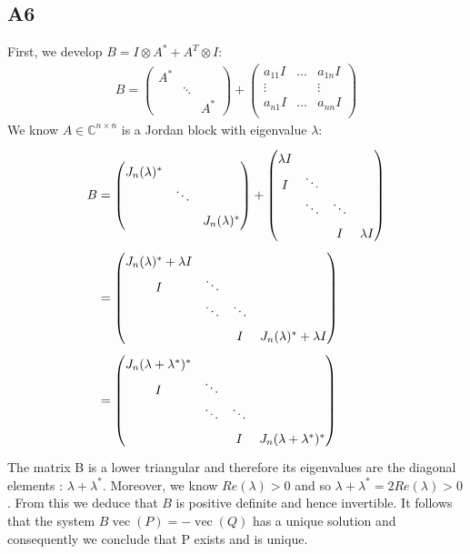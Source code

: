\documentclass[11pt]{article}
\newcommand{\kp}{\otimes}
\DeclareMathOperator{\vect}{vec}
\DeclareMathOperator{\vect}{vec}
\newcommand{\complex}{\mathbb{C}} %
\begin{document}
\subsection*{A6}
First, we develop $B=I\kp A^*+A^T\kp I$:
\begin{align*}
    B=
    \begin{pmatrix}
    A^* & & \\
    &\ddots&\\
    & & A^*
    \end{pmatrix}+
    \begin{pmatrix}
    a_{11} I & \dots & a_{1n} I\\
    \vdots & & \vdots\\
    a_{n1} I & \dots & a_{nn} I\\
    \end{pmatrix}
\end{align*}
We know $A\in\complex^{n\times n}$ is a Jordan block with eigenvalue $\lambda$:
\begin{align*}
    B&=
    \renewcommand{\arraystretch}{1.5}
    \begin{pmatrix}
    J_n(\lambda)^* & & \\
    &\ddots&\\
    & & J_n(\lambda)^*
    \end{pmatrix}+
    \begin{pmatrix}
    \lambda I & & &\\
    I & \ddots & &\\
    & \ddots & \ddots &\\
    & & I & \lambda I
    \end{pmatrix}\\
    &=\begin{pmatrix}
    J_n(\lambda)^*+\lambda I &  &  & \\
    I & \ddots & &\\
    & \ddots & \ddots &\\
    & & I & J_n(\lambda)^*+\lambda I
    \end{pmatrix}\\
    &=\begin{pmatrix}
    J_n(\lambda+\lambda^*)^* & & & \\
    I & \ddots & &\\
    & \ddots & \ddots &\\
    & & I & J_n(\lambda+\lambda^*)^*
    \end{pmatrix}
\end{align*}
The matrix B is a lower triangular and therefore its eigenvalues are the diagonal elements : $\lambda+\lambda^*$. Moreover, we know $Re(\lambda)>0$ and so $\lambda+\lambda^*=2Re(\lambda)>0$. From this we deduce that $B$ is positive definite and hence invertible. It follows that the system $B\vect(P)=-\vect(Q)$ has a unique solution and consequently we conclude that P exists and is unique.\\
\end{document}
